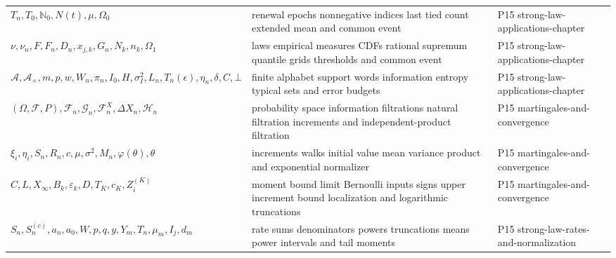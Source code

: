 \begin{longtable}{@{}p{}p{}p{}@{}}
\(T_n,\allowbreak T_0,\allowbreak \mathbb N_0,\allowbreak N(t),\allowbreak \mu,\allowbreak \Omega_0\) & renewal epochs nonnegative indices last tied count extended mean and common event & P15 strong-\allowbreak{}law-\allowbreak{}applications-\allowbreak{}chapter \\
\(\nu,\allowbreak \nu_n,\allowbreak F,\allowbreak F_n,\allowbreak D_n,\allowbreak x_{j,k},\allowbreak G_n,\allowbreak N_k,\allowbreak n_k,\allowbreak \Omega_1\) & laws empirical measures CDFs rational supremum quantile grids thresholds and common event & P15 strong-\allowbreak{}law-\allowbreak{}applications-\allowbreak{}chapter \\
\(\mathcal A,\allowbreak \mathcal A_+,\allowbreak m,\allowbreak p,\allowbreak w,\allowbreak W_n,\allowbreak \pi_n,\allowbreak I_0,\allowbreak H,\allowbreak \sigma_I^2,\allowbreak L_n,\allowbreak T_n(\epsilon),\allowbreak \eta_n,\allowbreak \delta,\allowbreak C,\allowbreak \bot\) & finite alphabet support words information entropy typical sets and error budgets & P15 strong-\allowbreak{}law-\allowbreak{}applications-\allowbreak{}chapter \\
\((\Omega,\allowbreak \mathcal F,\allowbreak P),\allowbreak \mathcal F_n,\allowbreak \mathcal G_n,\allowbreak \mathcal F_n^X,\allowbreak \Delta X_n,\allowbreak \mathcal H_n\) & probability space information filtrations natural filtration increments and independent-product filtration & P15 martingales-\allowbreak{}and-\allowbreak{}convergence \\
\(\xi_i,\allowbreak \eta_i,\allowbreak S_n,\allowbreak R_n,\allowbreak c,\allowbreak \mu,\allowbreak \sigma^2,\allowbreak M_n,\allowbreak \varphi(\theta),\allowbreak \theta\) & increments walks initial value mean variance product and exponential normalizer & P15 martingales-\allowbreak{}and-\allowbreak{}convergence \\
\(C,\allowbreak L,\allowbreak X_\infty,\allowbreak B_k,\allowbreak \varepsilon_k,\allowbreak D,\allowbreak T_K,\allowbreak c_K,\allowbreak Z_i^{(K)}\) & moment bound limit Bernoulli inputs signs upper increment bound localization and logarithmic truncations & P15 martingales-\allowbreak{}and-\allowbreak{}convergence \\
\(S_n,\allowbreak S_n^{(c)},\allowbreak a_n,\allowbreak a_0,\allowbreak W,\allowbreak p,\allowbreak q,\allowbreak y,\allowbreak Y_m,\allowbreak T_n,\allowbreak \mu_m,\allowbreak I_j,\allowbreak d_m\) & rate sums denominators powers truncations means power intervals and tail moments & P15 strong-\allowbreak{}law-\allowbreak{}rates-\allowbreak{}and-\allowbreak{}normalization \\

\end{longtable}
